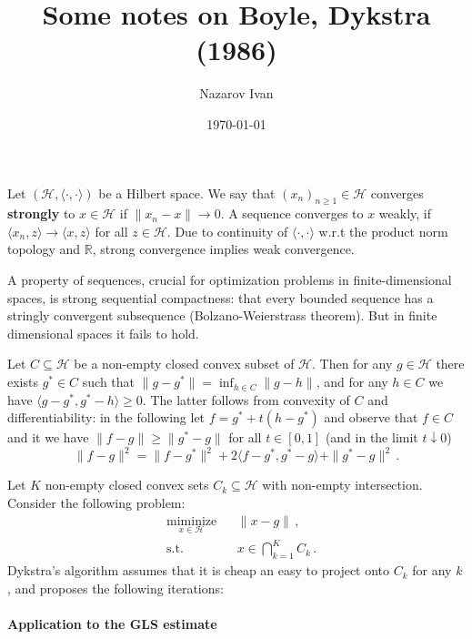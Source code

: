 \documentclass[a4paper]{article}
\title{Some notes on Boyle, Dykstra (1986)}
\author{Nazarov Ivan}
\date{\today}
\newcommand{\Hcal}{\mathcal{H}}
\newcommand{\real}{\mathbb{R}}
\begin{document}
\maketitle

Let $(\Hcal, \langle\cdot,\cdot\rangle)$ be a Hilbert space. We say that $(x_n)_{n\geq1} 
\in \Hcal$ converges {\bf strongly} to $x\in\Hcal$ if $\|x_n - x\| \to 0$. A sequence 
converges to $x$ weakly, if $\langle x_n, z \rangle \to \langle x, z\rangle$ for all
$z\in \Hcal$. Due to continuity of $\langle\cdot,\cdot\rangle$ w.r.t the product norm
topology and $\real$, strong convergence implies weak convergence.

A property of sequences, crucial for optimization problems in finite-dimensional spaces,
is strong sequential compactness: that every bounded sequence has a stringly convergent
subsequence (Bolzano-Weierstrass theorem). But in finite dimensional spaces it fails to
hold.

Let $C \subseteq \Hcal$ be a non-empty closed convex subset of $\Hcal$. Then for any
$g\in \Hcal$ there exists $g^*\in C$ such that $\|g - g^*\| = \inf_{h\in C} \|g - h\|$,
and for any $h\in C$ we have $\langle g - g^*, g^* - h\rangle \geq 0$. The latter follows
from convexity of $C$ and differentiability: in the following let $f = g^* + t (h -g ^*)$
and observe that $f \in C$ and it we have $\|f - g\| \geq \|g^* - g\|$ for all $t\in
[0, 1]$ (and in the limit $t\downarrow 0$)
\begin{equation*}
  \|f - g\|^2
    = \|f - g^*\|^2 + 2 \langle f - g^*, g^* - g\rangle + \|g^* - g\|^2
    \,.
\end{equation*}

Let $K$ non-empty closed convex sets $C_k \subseteq \Hcal$ with non-empty intersection.
Consider the following problem:
\begin{equation} \label{eq:k-projection}
  \begin{aligned}
    & \underset{x\in \Hcal}{\text{miminize}}
      & & \|x - g\|
          \,, \\
    & \text{s.t.}
      & & x \in \bigcap_{k=1}^K C_k
          \,.
  \end{aligned}
\end{equation}
Dykstra's algorithm assumes that it is cheap an easy to project onto $C_k$ for any $k$,
and proposes the following iterations:


\paragraph{Application to the GLS estimate} %
\label{par:application_to_the_gls_estimate}
\end{document}
